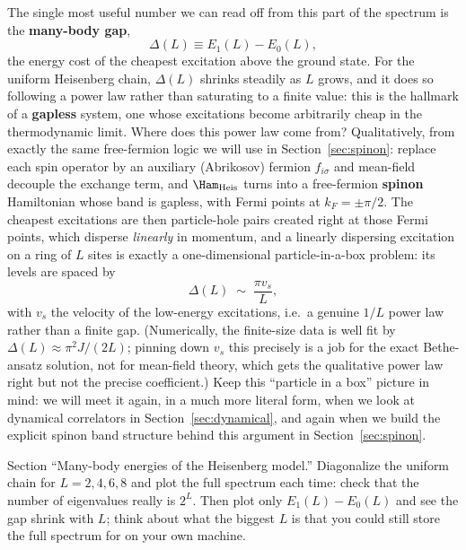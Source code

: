 \documentclass[all_sessions.tex]{subfiles}
\begin{document}
The single most useful number we can read off from this part of the spectrum is the \textbf{many-body
gap},
\begin{equation}
  \Delta(L) \equiv E_1(L) - E_0(L),
  \label{eq:manybodygap}
\end{equation}
the energy cost of the cheapest excitation above the ground state. For the uniform Heisenberg chain,
$\Delta(L)$ shrinks steadily as $L$ grows, and it does so following a power law rather than saturating
to a finite value: this is the hallmark of a \textbf{gapless} system, one whose excitations become
arbitrarily cheap in the thermodynamic limit. Where does this power law come from? Qualitatively, from
exactly the same free-fermion logic we will use in Section~\ref{sec:spinon}: replace each spin operator
by an auxiliary (Abrikosov) fermion $f_{i\sigma}$ and mean-field decouple the exchange term, and
$\Ham_{\mathrm{Heis}}$ turns into a free-fermion \textbf{spinon} Hamiltonian whose band is gapless, with
Fermi points at $k_F=\pm\pi/2$. The cheapest excitations are then particle-hole pairs created right at
those Fermi points, which disperse \emph{linearly} in momentum, and a linearly dispersing excitation on a
ring of $L$ sites is exactly a one-dimensional particle-in-a-box problem: its levels are spaced by
\begin{equation}
  \Delta(L) \;\sim\; \frac{\pi v_s}{L},
  \label{eq:gapscaling}
\end{equation}
with $v_s$ the velocity of the low-energy excitations, i.e.\ a genuine $1/L$ power law rather than a
finite gap. (Numerically, the finite-size data is well fit by $\Delta(L)\approx\pi^2J/(2L)$; pinning down
$v_s$ this precisely is a job for the exact Bethe-ansatz solution, not for mean-field theory, which gets
the qualitative power law right but not the precise coefficient.) Keep this ``particle in a box'' picture
in mind: we will meet it again, in a much more literal form, when we look at dynamical correlators in
Section~\ref{sec:dynamical}, and again when we build the explicit spinon band structure behind this
argument in Section~\ref{sec:spinon}.

\begin{notebook}
Section ``Many-body energies of the Heisenberg model.'' Diagonalize the uniform chain for
$L=2,4,6,8$ and plot the full spectrum each time: check that the number of eigenvalues really is
$2^L$. Then plot only $E_1(L)-E_0(L)$ and see the gap shrink with $L$; think about what the biggest
$L$ is that you could still store the full spectrum for on your own machine.
\end{notebook}
\end{document}
